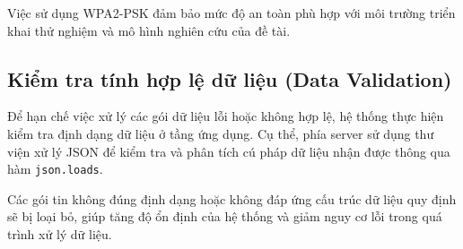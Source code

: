 Việc sử dụng WPA2-PSK đảm bảo mức độ an toàn phù hợp với môi trường triển khai thử
nghiệm và mô hình nghiên cứu của đề tài.

\subsection{Kiểm tra tính hợp lệ dữ liệu (Data Validation)}

Để hạn chế việc xử lý các gói dữ liệu lỗi hoặc không hợp lệ, hệ thống thực hiện
kiểm tra định dạng dữ liệu ở tầng ứng dụng. Cụ thể, phía server sử dụng thư viện
xử lý JSON để kiểm tra và phân tích cú pháp dữ liệu nhận được thông qua hàm
\texttt{json.loads}.

Các gói tin không đúng định dạng hoặc không đáp ứng cấu trúc dữ liệu quy định sẽ
bị loại bỏ, giúp tăng độ ổn định của hệ thống và giảm nguy cơ lỗi trong quá trình
xử lý dữ liệu.




